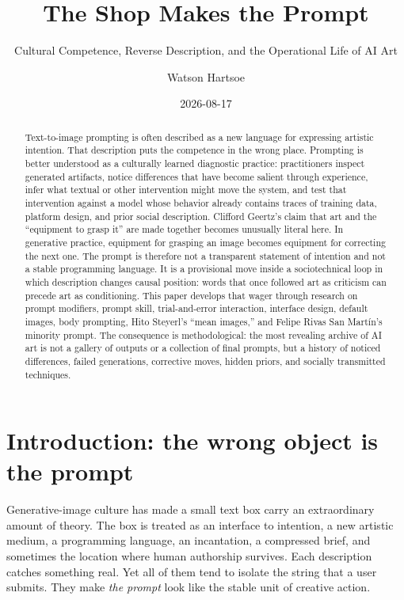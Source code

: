 \documentclass[
  11pt,
  letterpaper,
]{article}
\title{The Shop Makes the Prompt}
\subtitle{Cultural Competence, Reverse Description, and the Operational
Life of AI Art}
\author{Watson Hartsoe}
\date{2026-08-17}
\begin{document}
\maketitle
\begin{abstract}
Text-to-image prompting is often described as a new language for
expressing artistic intention. That description puts the competence in
the wrong place. Prompting is better understood as a culturally learned
diagnostic practice: practitioners inspect generated artifacts, notice
differences that have become salient through experience, infer what
textual or other intervention might move the system, and test that
intervention against a model whose behavior already contains traces of
training data, platform design, and prior social description. Clifford
Geertz's claim that art and the ``equipment to grasp it'' are made
together becomes unusually literal here. In generative practice,
equipment for grasping an image becomes equipment for correcting the
next one. The prompt is therefore not a transparent statement of
intention and not a stable programming language. It is a provisional
move inside a sociotechnical loop in which description changes causal
position: words that once followed art as criticism can precede art as
conditioning. This paper develops that wager through research on prompt
modifiers, prompt skill, trial-and-error interaction, interface design,
default images, body prompting, Hito Steyerl's ``mean images,'' and
Felipe Rivas San Martín's minority prompt. The consequence is
methodological: the most revealing archive of AI art is not a gallery of
outputs or a collection of final prompts, but a history of noticed
differences, failed generations, corrective moves, hidden priors, and
socially transmitted techniques.
\end{abstract}

\newpage

\section{Introduction: the wrong object is the
prompt}\label{introduction-the-wrong-object-is-the-prompt}

Generative-image culture has made a small text box carry an
extraordinary amount of theory. The box is treated as an interface to
intention, a new artistic medium, a programming language, an
incantation, a compressed brief, and sometimes the location where human
authorship survives. Each description catches something real. Yet all of
them tend to isolate the string that a user submits. They make \emph{the
prompt} look like the stable unit of creative action.
\end{document}
